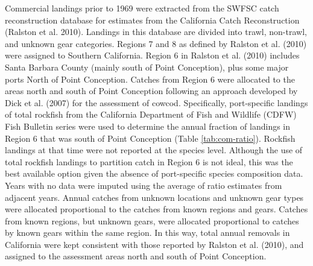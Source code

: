 \documentclass[11pt,
  english,
  a4paper,
]{article}
\begin{document}
\leavevmode\tagmcend\tagstructend\par


Commercial landings prior to 1969 were extracted from the SWFSC catch reconstruction database for estimates from the California Catch Reconstruction {(Ralston et al. 2010)\leavevmode\tagmcend\tagstructend}. Landings in this database are divided into trawl, non-trawl, and unknown gear categories. Regions 7 and 8 as defined by Ralston et al. {(2010)\leavevmode\tagmcend\tagstructend} were assigned to Southern California. Region 6 in Ralston et al. {(2010)\leavevmode\tagmcend\tagstructend} includes Santa Barbara County (mainly south of Point Conception), plus some major ports North of Point Conception. Catches from Region 6 were allocated to the areas north and south of Point Conception following an approach developed by Dick et al. {(2007)\leavevmode\tagmcend\tagstructend} for the assessment of cowcod. Specifically, port-specific landings of total rockfish from the California Department of Fish and Wildlife (CDFW) Fish Bulletin series were used to determine the annual fraction of landings in Region 6 that was south of Point Conception (Table \ref{tab:com-ratio}). Rockfish landings at that time were not reported at the species level. Although the use of total rockfish landings to partition catch in Region 6 is not ideal, this was the best available option given the absence of port-specific species composition data. Years with no data were imputed using the average of ratio estimates from adjacent years. Annual catches from unknown locations and unknown gear types were allocated proportional to the catches from known regions and gears. Catches from known regions, but unknown gears, were allocated proportional to catches by known gears within the same region. In this way, total annual removals in California were kept consistent with those reported by Ralston et al. {(2010)\leavevmode\tagmcend\tagstructend}, and assigned to the assessment areas north and south of Point Conception.

\leavevmode\tagmcend\tagstructend\par

\end{document}
